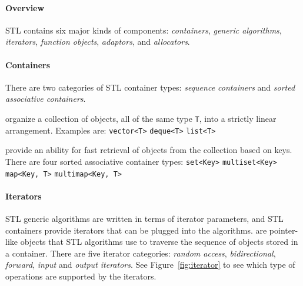 \documentclass{memo}
\begin{document}
\small
{}

\paragraph{Overview} STL contains six major kinds of components:
{\em containers}, {\em generic algorithms}, {\em iterators}, {\em function
  objects}, {\em adaptors}, and {\em allocators}.

\paragraph{Containers}
There are two categories of STL container types: {\em sequence containers\/}
and {\em sorted associative containers}.

 organize a collection of objects, all of the same
type \verb+T+, into a strictly linear arrangement. Examples are:
\bit
\w \verb+vector<T>+
\w \verb+deque<T>+
\w \verb+list<T>+
\eit

 provide an ability for fast retrieval of
objects from the collection based on keys. There are four sorted associative
container types: 
\bit
\w \verb+set<Key>+
\w \verb+multiset<Key>+
\w \verb+map<Key, T>+
\w \verb+multimap<Key, T>+
\eit


\paragraph{Iterators} 
STL generic algorithms are written in terms of iterator parameters, and STL
containers provide iterators that can be plugged into the
algorithms.  are pointer-like objects that STL algorithms use to
traverse the sequence of objects stored in a container. There are five
iterator categories: {\em random access\/}, {\em bidirectional\/}, {\em
  forward\/}, {\em input\/} and {\em output iterators\/}.  See
Figure~\ref{fig:iterator} to see which type of operations are supported by the iterators.
\end{document}
